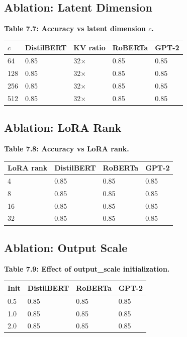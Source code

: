 \subsection{Ablation: Latent Dimension}

\textbf{Table 7.7: Accuracy vs latent dimension $c$.}

\begin{table}[H]
\centering
\small
\begin{tabular}{lllll}
\toprule
\textbf{$c$} & \textbf{DistilBERT} & \textbf{KV ratio} & \textbf{RoBERTa} & \textbf{GPT-2} \\
\midrule
64 & 0.85 & 32$\times$ & 0.85 & 0.85 \\
128 & 0.85 & 32$\times$ & 0.85 & 0.85 \\
256 & 0.85 & 32$\times$ & 0.85 & 0.85 \\
512 & 0.85 & 32$\times$ & 0.85 & 0.85 \\
\bottomrule
\end{tabular}
\end{table}

\subsection{Ablation: LoRA Rank}

\textbf{Table 7.8: Accuracy vs LoRA rank.}

\begin{table}[H]
\centering
\small
\begin{tabular}{llll}
\toprule
\textbf{LoRA rank} & \textbf{DistilBERT} & \textbf{RoBERTa} & \textbf{GPT-2} \\
\midrule
4 & 0.85 & 0.85 & 0.85 \\
8 & 0.85 & 0.85 & 0.85 \\
16 & 0.85 & 0.85 & 0.85 \\
32 & 0.85 & 0.85 & 0.85 \\
\bottomrule
\end{tabular}
\end{table}

\subsection{Ablation: Output Scale}

\textbf{Table 7.9: Effect of output\_scale initialization.}

\begin{table}[H]
\centering
\small
\begin{tabular}{llll}
\toprule
\textbf{Init} & \textbf{DistilBERT} & \textbf{RoBERTa} & \textbf{GPT-2} \\
\midrule
0.5 & 0.85 & 0.85 & 0.85 \\
1.0 & 0.85 & 0.85 & 0.85 \\
2.0 & 0.85 & 0.85 & 0.85 \\
\bottomrule
\end{tabular}
\end{table}

